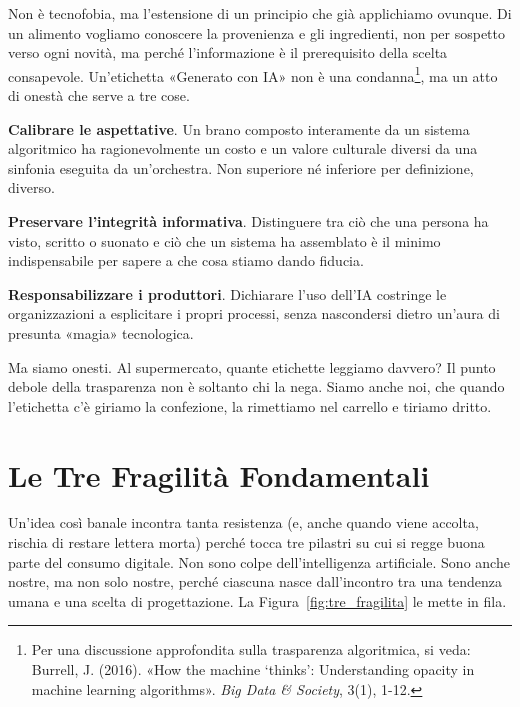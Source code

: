 Non è tecnofobia, ma l'estensione di un principio che già applichiamo ovunque. Di un alimento vogliamo conoscere la provenienza e gli ingredienti, non per sospetto verso ogni novità, ma perché l'informazione è il prerequisito della scelta consapevole. Un'etichetta «Generato con IA» non è una condanna\footnote{Per una discussione approfondita sulla trasparenza algoritmica, si veda: Burrell, J. (2016). «How the machine ‘thinks’: Understanding opacity in machine learning algorithms». \textit{Big Data \& Society}, 3(1), 1-12.}, ma un atto di onestà che serve a tre cose.

\textbf{Calibrare le aspettative}. Un brano composto interamente da un sistema algoritmico ha ragionevolmente un costo e un valore culturale diversi da una sinfonia eseguita da un'orchestra. Non superiore né inferiore per definizione, diverso.

\textbf{Preservare l'integrità informativa}. Distinguere tra ciò che una persona ha visto, scritto o suonato e ciò che un sistema ha assemblato è il minimo indispensabile per sapere a che cosa stiamo dando fiducia.

\textbf{Responsabilizzare i produttori}. Dichiarare l'uso dell'IA costringe le organizzazioni a esplicitare i propri processi, senza nascondersi dietro un'aura di presunta «magia» tecnologica.

Ma siamo onesti. Al supermercato, quante etichette leggiamo davvero? Il punto debole della trasparenza non è soltanto chi la nega. Siamo anche noi, che quando l'etichetta c'è giriamo la confezione, la rimettiamo nel carrello e tiriamo dritto.

\section{Le Tre Fragilità Fondamentali}

Un'idea così banale incontra tanta resistenza (e, anche quando viene accolta, rischia di restare lettera morta) perché tocca tre pilastri su cui si regge buona parte del consumo digitale. Non sono colpe dell'intelligenza artificiale. Sono anche nostre, ma non solo nostre, perché ciascuna nasce dall'incontro tra una tendenza umana e una scelta di progettazione. La Figura~\ref{fig:tre_fragilita} le mette in fila.



